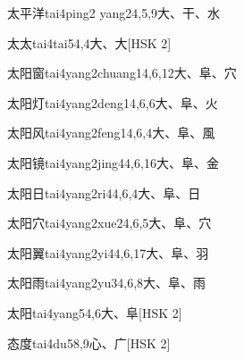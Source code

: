 \begin{entry}{太平洋}{tai4ping2 yang2}{4,5,9}{⼤、⼲、⽔}
\end{entry}

\begin{entry}{太太}{tai4tai5}{4,4}{⼤、⼤}[HSK 2]
\end{entry}

\begin{entry}{太阳窗}{tai4yang2chuang1}{4,6,12}{⼤、⾩、⽳}
\end{entry}

\begin{entry}{太阳灯}{tai4yang2deng1}{4,6,6}{⼤、⾩、⽕}
\end{entry}

\begin{entry}{太阳风}{tai4yang2feng1}{4,6,4}{⼤、⾩、⾵}
\end{entry}

\begin{entry}{太阳镜}{tai4yang2jing4}{4,6,16}{⼤、⾩、⾦}
\end{entry}

\begin{entry}{太阳日}{tai4yang2ri4}{4,6,4}{⼤、⾩、⽇}
\end{entry}

\begin{entry}{太阳穴}{tai4yang2xue2}{4,6,5}{⼤、⾩、⽳}
\end{entry}

\begin{entry}{太阳翼}{tai4yang2yi4}{4,6,17}{⼤、⾩、⽻}
\end{entry}

\begin{entry}{太阳雨}{tai4yang2yu3}{4,6,8}{⼤、⾩、⾬}
\end{entry}

\begin{entry}{太阳}{tai4yang5}{4,6}{⼤、⾩}[HSK 2]
\end{entry}

\begin{entry}{态度}{tai4du5}{8,9}{⼼、⼴}[HSK 2]
\end{entry}

